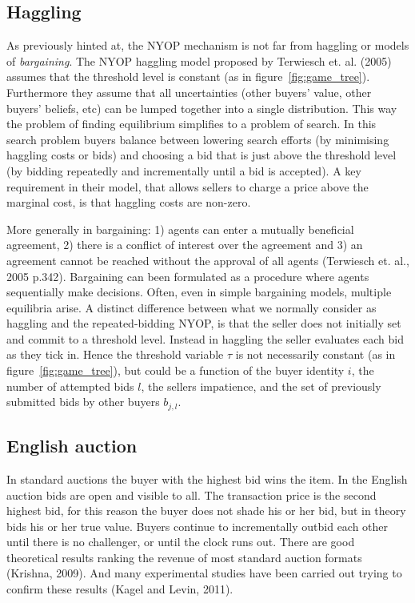\documentclass[a4paper,12pt]{article}
\begin{document}
	\subsection{Haggling}

	As previously hinted at, the NYOP mechanism is not far from haggling or models of {\it bargaining}. The NYOP haggling model proposed by Terwiesch et. al. (2005) assumes that the threshold level is constant (as in figure~\ref{fig:game_tree}). Furthermore they assume that all uncertainties (other buyers' value, other buyers' beliefs, etc) can be lumped together into a single distribution. This way the problem of finding equilibrium simplifies to a problem of search. In this search problem buyers balance between lowering search efforts (by minimising haggling costs or bids) and choosing a bid that is just above the threshold level (by bidding repeatedly and incrementally until a bid is accepted). A key requirement in their model, that allows sellers to charge a price above the marginal cost, is that haggling costs are non-zero.

	More generally in bargaining: 1) agents can enter a mutually beneficial agreement, 2) there is a conflict of interest over the agreement and 3) an agreement cannot be reached without the approval of all agents (Terwiesch et. al., 2005 p.342). Bargaining can been formulated as a procedure where agents sequentially make decisions. Often, even in simple bargaining models, multiple equilibria arise. A distinct difference between what we normally consider as haggling and the repeated-bidding NYOP, is that the seller does not initially set and commit to a threshold level. Instead in haggling the seller evaluates each bid as they tick in. Hence the threshold variable $\tau$ is not necessarily constant (as in figure~\ref{fig:game_tree}), but could be a function of the buyer identity $i$, the number of attempted bids $l$, the sellers impatience, and the set of previously submitted bids by other buyers $b_{j,l}$.

	\subsection{English auction}

	In standard auctions the buyer with the highest bid wins the item. In the English auction bids are open and visible to all. The transaction price is the second highest bid, for this reason the buyer does not shade his or her bid, but in theory bids his or her true value. Buyers continue to incrementally outbid each other until there is no challenger, or until the clock runs out.  There are good theoretical results ranking the revenue of most standard auction formats (Krishna, 2009). And many experimental studies have been carried out trying to confirm these results (Kagel and Levin, 2011). 
\end{document}
